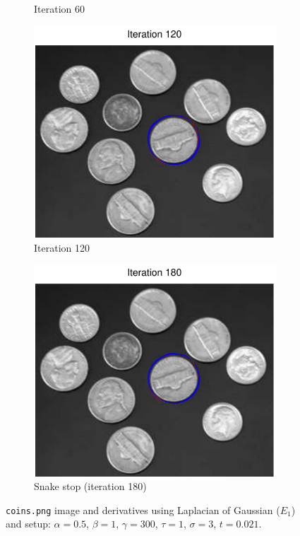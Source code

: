 \documentclass[11pt,a4paper]{article}
\begin{document}
\begin{figure}[H]
\begin{subfigure}[t]{0.24\textwidth}
        \caption{Iteration 60}
        \label{fig:coins_log_60}
    \end{subfigure}
    \begin{subfigure}[t]{0.24\textwidth}
        \includegraphics[width=\textwidth]{src/images/coins_log_120.pdf}
        \caption{Iteration 120}
        \label{fig:coins_log_120}
    \end{subfigure}
    \begin{subfigure}[t]{0.24\textwidth}
        \includegraphics[width=\textwidth]{src/images/coins_log_180.pdf}
        \caption{Snake stop (iteration 180)}
        \label{fig:coins_log_180}
    \end{subfigure}
    \caption{\texttt{coins.png} image and derivatives using Laplacian of
    Gaussian
($E_1$) and setup: $\alpha = 0.5$, $\beta = 1$, $\gamma = 300$, $\tau = 1$,
$\sigma = 3$, $t = 0.021$.}
    \label{fig:coins_log}
\end{figure}
\end{document}
